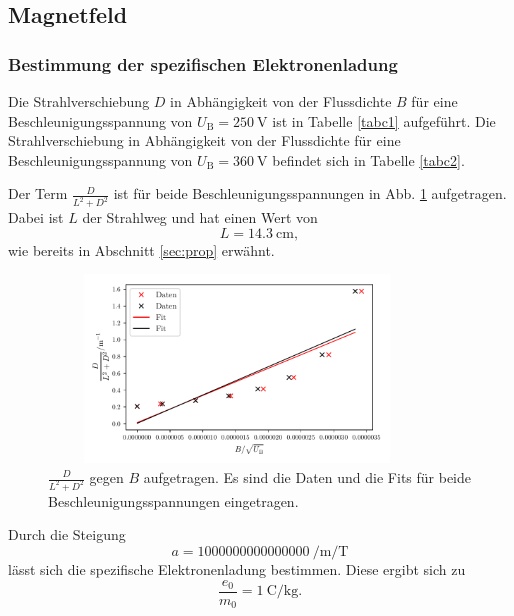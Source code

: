 \subsection{Magnetfeld}
\subsubsection{Bestimmung der spezifischen Elektronenladung}
Die Strahlverschiebung $D$ in Abhängigkeit von der Flussdichte $B$
für eine Beschleunigungsspannung von $U_\text{B} = \SI{250}{\volt}$
ist in Tabelle \ref{tabc1} aufgeführt. Die Strahlverschiebung in
Abhängigkeit von der Flussdichte für eine Beschleunigungsspannung
von $U_\text{B} = \SI{360}{\volt}$ befindet sich in Tabelle \ref{tabc2}.



\noindent Der Term $\frac{D}{L^2 + D^2}$ ist für beide Beschleunigungsspannungen
in Abb. \ref{fig:plot2} aufgetragen. Dabei ist $L$ der Strahlweg und
hat einen Wert von
\begin{equation*}
    L = \SI{14.3}{\centi\meter},
\end{equation*}
wie bereits in Abschnitt \ref{sec:prop} erwähnt.

\begin{figure}
    \centering
    \includegraphics[width=10cm, height=5cm]{build/plot2.pdf}
    \caption{$\frac{D}{L^2 + D^2}$ gegen $B$ aufgetragen.
    Es sind die Daten und die Fits für beide Beschleunigungsspannungen
    eingetragen.}
    \label{fig:plot2}
\end{figure}

\noindent Durch die Steigung
\begin{equation*}
    a = \SI{1000000000000000}{\per\meter\per\tesla} %
\end{equation*}
lässt sich die spezifische Elektronenladung bestimmen.
Diese ergibt sich zu
\begin{equation*}
    \frac{e_0}{m_0} = \SI{1}{\coulomb\per\kilogram}.
\end{equation*}

